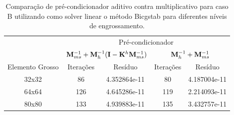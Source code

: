 \begin{table}[]
    \caption{Comparação de pré-condicionador aditivo contra multiplicativo para caso B utilizando como solver linear o método Bicgstab para diferentes níveis de engrossamento.}
    \label{table:precondcasoBcomp}
    \begin{tabular}{c|c|c|c|l|}
    \cline{2-5}
                                          & \multicolumn{4}{c|}{Pré-condicionador}                                                        \\ \cline{2-5} 
                                          & \multicolumn{2}{c|}{$\mathbf{M}^{-1}_{ms} +\mathbf{M}^{-1}_{h}(\mathbf{I}- \mathbf{K}^h \mathbf{M}^{-1}_{ms})$}               & \multicolumn{2}{c|}{$\mathbf{M}^{-1}_{h} + \mathbf{M}^{-1}_{ms}$}                \\ \hline
    \multicolumn{1}{|c|}{Elemento Grosso} & Iterações & \multicolumn{1}{c|}{Resíduo}      & Iterações & \multicolumn{1}{c|}{Resíduo}      \\ \hline
    \multicolumn{1}{|c|}{32x32}           & 86        & \multicolumn{1}{c|}{4.352864e-11} & 80        & \multicolumn{1}{c|}{4.187004e-11} \\ \hline
    \multicolumn{1}{|c|}{64x64}           & 126       & 4.645286e-11                      & 119       & 2.214093e-11                      \\ \hline
    \multicolumn{1}{|c|}{80x80}           & 133       & 4.939883e-11                      & 135       & 3.432757e-11                      \\ \hline
    \end{tabular}
\end{table}

